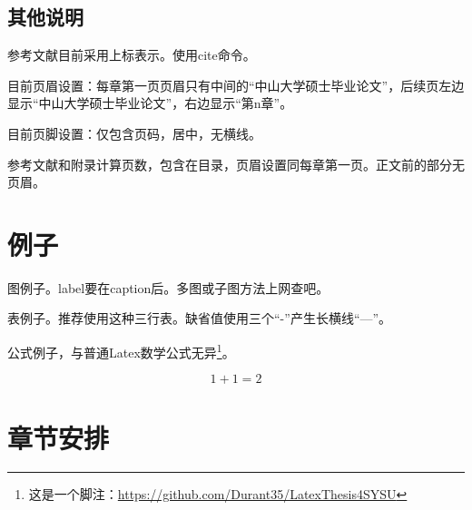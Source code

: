 \subsection{其他说明}
\label{sec:setting}

参考文献\cite{wu2013online}目前采用上标表示。使用cite命令。

目前页眉设置：每章第一页页眉只有中间的“中山大学硕士毕业论文”，后续页左边显示“中山大学硕士毕业论文”，右边显示“第n章”。

目前页脚设置：仅包含页码，居中，无横线。

参考文献和附录计算页数，包含在目录，页眉设置同每章第一页。正文前的部分无页眉。

\section{例子}
\label{sec:examples}

图例子。label要在caption后。多图或子图方法上网查吧。



表例子。推荐使用这种三行表。缺省值使用三个“-”产生长横线“---”。



公式例子，与普通Latex数学公式无异\footnote{这是一个脚注：\href{https://github.com/Durant35/LatexThesis4SYSU}{https://github.com/Durant35/LatexThesis4SYSU}}。

\begin{equation} \label{eq:Add}
1+1=2
\end{equation}

\section{章节安排}


\ifprint
	\newpage
	\thispagestyle{empty}
	\mbox{}
	
	\clearpage
	\setcounter{page}{10}
\fi